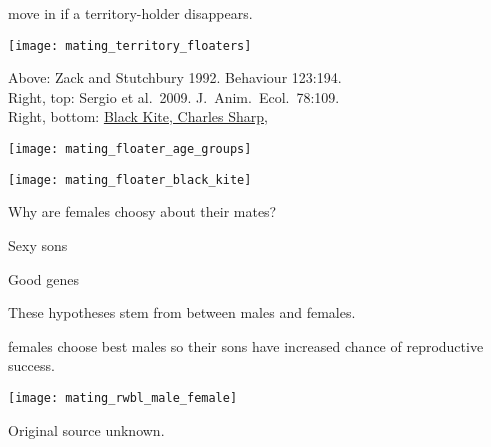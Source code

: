 \documentclass[t]{beamer}
\begin{document}
\begin{frame}[t]{ move in if a territory-holder disappears.}
\vspace{-0.5\baselineskip}
\begin{multicols}{2}

\noindent\texttt{[image: mating\_territory\_floaters]}

\vfilll

{\tiny
Above: Zack and Stutchbury 1992. Behaviour 123:194.\\
Right, top: Sergio et al.~2009. J.~Anim.~Ecol.~78:109.\\
Right, bottom: \href{https://commons.wikimedia.org/wiki/File:Black_kite_(Milvus_migrans_migrans)_in_flight.jpg}{Black Kite, Charles Sharp, }\\
}

\columnbreak

\noindent\texttt{[image: mating\_floater\_age\_groups]}

\noindent\texttt{[image: mating\_floater\_black\_kite]}

\end{multicols}
\end{frame}


\begin{frame}[t]{Why are females choosy about their mates?}

\begin{multicols}{2}

\hangpara {}

\hangpara \quad Sexy sons

\hangpara \quad Good genes

\columnbreak


\end{multicols}

\hangpara These hypotheses stem from  between males and females.

\end{frame}


\begin{frame}[t]{ females choose best males so their sons have increased chance of reproductive success.}

\vspace{-0.5\baselineskip}
\centering
\texttt{[image: mating\_rwbl\_male\_female]}

\vfilll

\tinyfill Original source unknown.

\end{frame}
\end{document}

